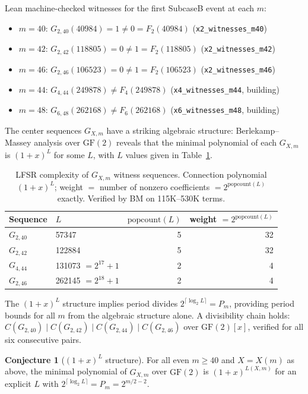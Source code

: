 \documentclass[11pt]{article}
\theoremstyle{plain}
\theoremstyle{definition}
\newtheorem{conjecture}[theorem]{Conjecture}
\begin{document}
Lean machine-checked witnesses for the first SubcaseB event at each $m$:
\begin{itemize}
  \item $m=40$: $G_{2,40}(40984)=1 \neq 0 = F_2(40984)$ \hfill(\texttt{x2\_witnesses\_m40})
  \item $m=42$: $G_{2,42}(118805)=0 \neq 1 = F_2(118805)$ \hfill(\texttt{x2\_witnesses\_m42})
  \item $m=46$: $G_{2,46}(106523)=0 \neq 1 = F_2(106523)$ \hfill(\texttt{x2\_witnesses\_m46})
  \item $m=44$: $G_{4,44}(249878) \neq F_4(249878)$ \hfill(\texttt{x4\_witnesses\_m44}, building)
  \item $m=48$: $G_{6,48}(262168) \neq F_6(262168)$ \hfill(\texttt{x6\_witnesses\_m48}, building)
\end{itemize}

The center sequences $G_{X,m}$ have a striking algebraic structure: Berlekamp--Massey
analysis over $\mathrm{GF}(2)$ reveals that the minimal polynomial of each $G_{X,m}$ is
$(1+x)^L$ for some $L$, with $L$ values given in Table~\ref{tab:lfsr}.
\begin{table}[h]
\centering
\begin{tabular}{llrr}
\hline
Sequence & $L$ & $\mathrm{popcount}(L)$ & weight $= 2^{\mathrm{popcount}(L)}$ \\
\hline
$G_{2,40}$ & 57347 & 5 & 32 \\
$G_{2,42}$ & 122884 & 5 & 32 \\
$G_{4,44}$ & 131073 $= 2^{17}+1$ & 2 & 4 \\
$G_{2,46}$ & 262145 $= 2^{18}+1$ & 2 & 4 \\
\hline
\end{tabular}
\caption{LFSR complexity of $G_{X,m}$ witness sequences.  Connection polynomial $(1+x)^L$;
weight $= $ number of nonzero coefficients $= 2^{\mathrm{popcount}(L)}$ exactly.
Verified by BM on 115K--530K terms.}
\label{tab:lfsr}
\end{table}

The $(1+x)^L$ structure implies period divides $2^{\lceil \log_2 L \rceil} = P_m$,
providing period bounds for all $m$ from the algebraic structure alone.
A divisibility chain holds: $C(G_{2,40}) \mid C(G_{2,42}) \mid C(G_{2,44}) \mid C(G_{2,46})$
over $\mathrm{GF}(2)[x]$, verified for all six consecutive pairs.

\begin{conjecture}[$(1{+}x)^L$ structure]
For all even $m \geq 40$ and $X=X(m)$ as above, the minimal polynomial of
$G_{X,m}$ over $\mathrm{GF}(2)$ is $(1+x)^{L(X,m)}$ for an explicit $L$ with
$2^{\lceil \log_2 L \rceil} = P_m = 2^{m/2-2}$.
\end{conjecture}
\end{document}
